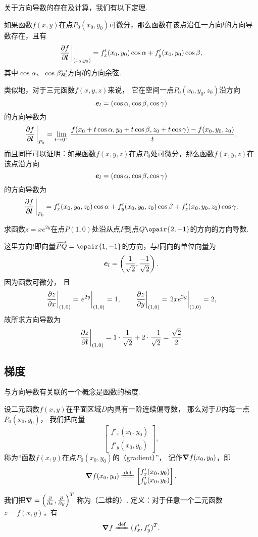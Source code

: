 关于方向导数的存在及计算，我们有以下定理.
\begin{theorem}[充分条件]
如果函数\(f(x,y)\)在点\(P_0(x_0,y_0)\)可微分，那么函数在该点沿任一方向\(l\)的方向导数存在，且有\[
\pdv{f}{\vb{l}}\eval_{(x_0,y_0)}
=f'_x(x_0,y_0) \cos\alpha + f'_y(x_0,y_0) \cos\beta,
\]其中\(\cos\alpha\)、\(\cos\beta\)是方向\(l\)的方向余弦.
\end{theorem}

类似地，对于三元函数\(f(x,y,z)\)来说，
它在空间一点\(P_0(x_0,y_0,z_0)\)沿方向\[
	\boldsymbol{e}_l = (\cos\alpha,\cos\beta,\cos\gamma)
\]的方向导数为\[
	\pdv{f}{\vb{l}}\eval_{P_0}
	= \lim\limits_{t\to0^+}
	\frac{f(x_0+t\cos\alpha,y_0+t\cos\beta,z_0+t\cos\gamma)-f(x_0,y_0,z_0)}{t}.
\]
而且同样可以证明：如果函数\(f(x,y,z)\)在点\(P_0\)处可微分，那么函数\(f(x,y,z)\)在该点沿方向\[
	\boldsymbol{e}_l = (\cos\alpha,\cos\beta,\cos\gamma)
\]的方向导数为\[
\pdv{f}{\vb{l}}\eval_{P_0}
= f'_x(x_0,y_0,z_0) \cos\alpha + f'_y(x_0,y_0,z_0) \cos\beta + f'_z(x_0,y_0,z_0) \cos\gamma.
\]

\begin{example}
求函数\(z = x e^{2y}\)在点\(P(1,0)\)处沿从点\(P\)到点\(Q\opair{2,-1}\)的方向的方向导数.
\begin{solution}
这里方向\(l\)即向量\(\vec{PQ} = \opair{1,-1}\)的方向，与\(l\)同向的单位向量为\[
	\boldsymbol{e}_l
	= \left(
		\frac{1}{\sqrt{2}},
		\frac{-1}{\sqrt{2}}
	\right).
\]
因为函数可微分，
且\[
	\eval{\pdv{z}{x}}_{(1,0)}
	= \eval{e^{2y}}_{(1,0)}
	= 1,
	\qquad
	\eval{\pdv{z}{y}}_{(1,0)}
	= \eval{2xe^{2y}}_{(1,0)}
	= 2,
\]
故所求方向导数为\[
	\eval{\pdv{z}{\vb{l}}}_{(1,0)}
	= 1 \cdot \frac{1}{\sqrt{2}} + 2 \cdot \frac{-1}{\sqrt{2}}
	= \frac{\sqrt{2}}{2}.
\]
\end{solution}
\end{example}

\subsection{梯度}
与方向导数有关联的一个概念是函数的梯度.
\begin{definition}
设二元函数\(f(x,y)\)在平面区域\(D\)内具有一阶连续偏导数，
那么对于\(D\)内每一点\(P_0\allowbreak(x_0,y_0)\)，
我们把向量\[
	\begin{bmatrix}
		f'_x(x_0,y_0) \\
		f'_y(x_0,y_0)
	\end{bmatrix},
\]称为“函数\(f(x,y)\)在点\(P_0(x_0,y_0)\)的（gradient）”，
记作\(\grad f(x_0,y_0)\)，即\[
	\grad f(x_0,y_0)
	\defeq
	\begin{bmatrix}
		f'_x(x_0,y_0) \\
		f'_y(x_0,y_0)
	\end{bmatrix}.
\]

我们把\(\grad = \left(\pdv{x},\pdv{y}\right)^T\)
称为（二维的）.
定义：对于任意一个二元函数\(z=f(x,y)\)，有\[
	\grad f
	\defeq
	(f'_x,f'_y)^T.
\]
\end{definition}

